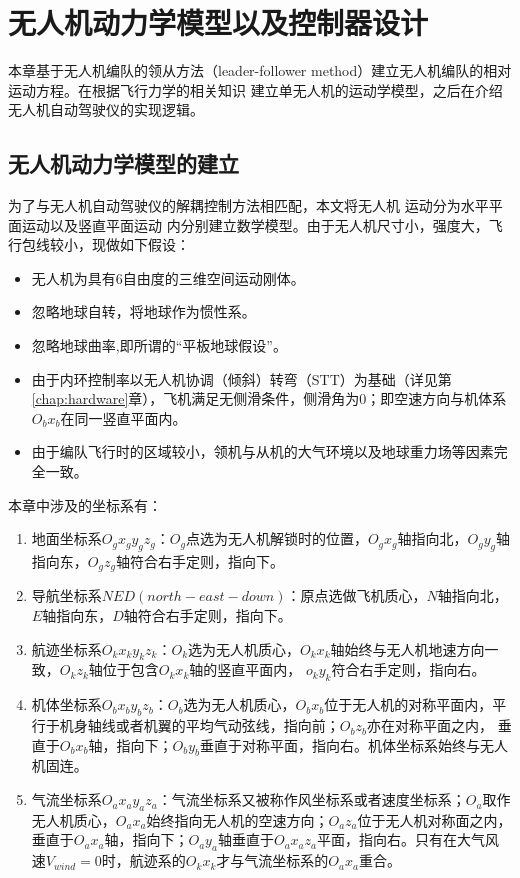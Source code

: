 %
%
%
%

\chapter{无人机动力学模型以及控制器设计}
\label{chap:formation_dynamic_equ}
本章基于无人机编队的领从方法（leader-follower method）建立无人机编队的相对运动方程。在根据飞行力学的相关知识
建立单无人机的运动学模型，之后在介绍无人机自动驾驶仪的实现逻辑。
\section{无人机动力学模型的建立}
为了与无人机自动驾驶仪的解耦控制方法相匹配，本文将无人机
运动分为水平平面运动以及竖直平面运动
内分别建立数学模型。由于无人机尺寸小，强度大，飞行包线较小，现做如下假设：
\begin{itemize}
    \item 无人机为具有6自由度的三维空间运动刚体。
    \item 忽略地球自转，将地球作为惯性系。
    \item 忽略地球曲率,即所谓的“平板地球假设”。\cite{Wusentang2013}
    \item 由于内环控制率以无人机协调（倾斜）转弯（STT）为基础（详见第\ref{chap:hardware}章），飞机满足无侧滑条件，侧滑角为0；即空速方向与机体系$O_bx_b$在同一竖直平面内。
    \item 由于编队飞行时的区域较小，领机与从机的大气环境以及地球重力场等因素完全一致。
\end{itemize}
本章中涉及的坐标系有：
\begin{enumerate}
    \item 地面坐标系$O_gx_gy_gz_g$：$O_g$点选为无人机解锁时的位置，$O_gx_g$轴指向北，$O_gy_g$轴指向东，$O_gz_g$轴符合右手定则，指向下。
    \item 导航坐标系$NED(north-east-down)$：原点选做飞机质心，$N$轴指向北，$E$轴指向东，$D$轴符合右手定则，指向下。
    \item 航迹坐标系$O_kx_ky_kz_k$：$O_k$选为无人机质心，$O_kx_k$轴始终与无人机地速方向一致，$O_kz_k$轴位于包含$O_kx_k$轴的竖直平面内，
    $o_ky_k$符合右手定则，指向右。
    \item 机体坐标系$O_bx_by_bz_b$：$O_b$选为无人机质心，$O_bx_b$位于无人机的对称平面内，平行于机身轴线或者机翼的平均气动弦线，指向前；$O_bz_b$亦在对称平面之内，
    垂直于$O_bx_b$轴，指向下；$O_by_b$垂直于对称平面，指向右。机体坐标系始终与无人机固连。
    \item 气流坐标系$O_ax_ay_az_a$：气流坐标系又被称作风坐标系或者速度坐标系；$O_a$取作无人机质心，$O_ax_a$始终指向无人机的空速方向；$O_az_a$位于无人机对称面之内，
    垂直于$O_ax_a$轴，指向下；$O_ay_a$轴垂直于$O_ax_az_a$平面，指向右。只有在大气风速$V_{wind}=0$时，航迹系的$O_kx_k$才与气流坐标系的$O_ax_a$重合。
\end{enumerate}
